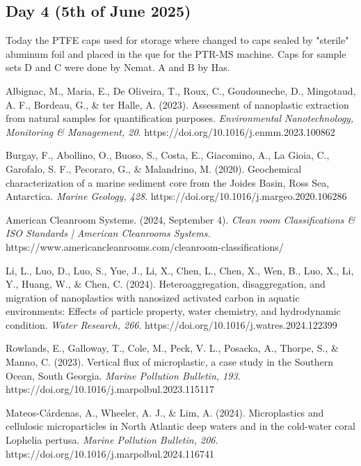 \documentclass[twocolumn,a4paper,aps,amsmath,amssymb,floatfix,superscriptaddress]{revtex4-2}
\begin{document}
	\subsection{Day 4 (5th of June 2025)}
	Today the PTFE caps used for storage where changed to caps sealed by "sterile" aluminum foil and placed in the que for the PTR-MS machine. Caps for sample sets D and C were done by Nemat. A and B by Has. 
	
	\begin{thebibliography}{99}		
		Albignac, M., Maria, E., De Oliveira, T., Roux, C., Goudouneche, D., Mingotaud, A. F., Bordeau, G., \& ter Halle, A. (2023). Assessment of nanoplastic extraction from natural samples for quantification purposes. \textit{Environmental Nanotechnology, Monitoring \& Management, 20}. https://doi.org/10.1016/j.enmm.2023.100862
		
		Burgay, F., Abollino, O., Buoso, S., Costa, E., Giacomino, A., La Gioia, C., Garofalo, S. F., Pecoraro, G., \& Malandrino, M. (2020). Geochemical characterization of a marine sediment core from the Joides Basin, Ross Sea, Antarctica. \textit{Marine Geology, 428}. https://doi.org/10.1016/j.margeo.2020.106286 
				
		American Cleanroom Systems. (2024, September 4). \textit{Clean room Classifications \& ISO Standards | American Cleanrooms Systems.} https://www.americancleanrooms.com/cleanroom-classifications/
		
		Li, L., Luo, D., Luo, S., Yue, J., Li, X., Chen, L., Chen, X., Wen, B., Luo, X., Li, Y., Huang, W., \& Chen, C. (2024). Heteroaggregation, disaggregation, and migration of nanoplastics with nanosized activated carbon in aquatic environments: Effects of particle property, water chemistry, and hydrodynamic condition. \textit{Water Research, 266}. https://doi.org/10.1016/j.watres.2024.122399
		
		Rowlands, E., Galloway, T., Cole, M., Peck, V. L., Posacka, A., Thorpe, S., \& Manno, C. (2023). Vertical flux of microplastic, a case study in the Southern Ocean, South Georgia. \textit{Marine Pollution Bulletin, 193}. https://doi.org/10.1016/j.marpolbul.2023.115117
		
		Mateos-Cárdenas, A., Wheeler, A. J., \& Lim, A. (2024). Microplastics and cellulosic microparticles in North Atlantic deep waters and in the cold-water coral Lophelia pertusa. \textit{Marine Pollution Bulletin, 206}. https://doi.org/10.1016/j.marpolbul.2024.116741
		

\end{thebibliography}
\end{document}
